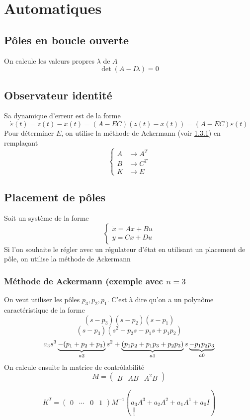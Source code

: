 \documentclass[resume]{subfiles}
\begin{document}
\section{Automatiques}
\subsection{Pôles en boucle ouverte}
On calcule les valeurs propres $\lambda$ de $A$
$$\det\left(A-I\lambda\right)=0$$
\subsection{Observateur identité}
Sa dynamique d'erreur est de la forme
$$\dot{\varepsilon}(t)=\dot{z}(t)-\dot{x}(t)=(A-EC)(z(t)-x(t))=(A-EC)\varepsilon(t)$$
Pour déterminer $E$, on utilise la méthode de Ackermann (voir \ref{ackermann}) en remplaçant
$$\begin{cases}
A & \longrightarrow A^{T}\\
B & \longrightarrow C^{T}\\
K & \longrightarrow E
\end{cases}$$
\subsection{Placement de pôles}
Soit un système de la forme
$$\begin{cases}
\dot{x} = Ax+Bu\\
y = Cx + Du
\end{cases}$$
Si l'on souhaite le régler avec un régulateur d'état en utilisant un placement de pôle, on utilise la méthode de Ackermann
\subsubsection{Méthode de Ackermann (exemple avec $n=3$}
\label{ackermann}
On veut utiliser les pôles $p_3,p_2,p_1$. C'est à dire qu'on a un polynôme caractéristique de la forme
$$(s-p_3)(s-p_2)(s-p_1)$$
$$(s-p_3)(s^2-p_2s-p_1s+p_1p_2)$$
$$\textcolor{gray}{a_3}s^3\underbrace{-(p_1+p_2+p_3)}_{a2}s^2+\underbrace{(p_1p_2+p_1p_3+p_2p_3)}_{a1}s\underbrace{-p_1p_2p_3}_{a0}$$
On calcule ensuite la matrice de contrôlabilité
$$M=\begin{pmatrix}
B & AB & A^2B
\end{pmatrix}$$


$$K^T = \begin{pmatrix}
0 & \cdots & 0 & 1
\end{pmatrix}M^{-1}\left(\underset{\underset{1}{\parallel}}{a_3}A^{3}+a_2A^2+a_1A^1+a_0I\right)$$
\end{document}
